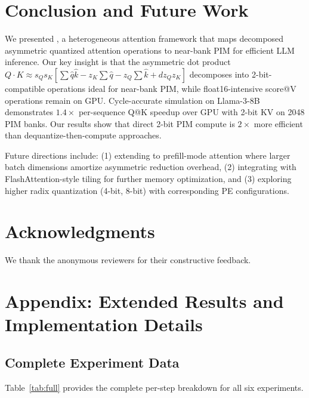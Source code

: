 \section{Conclusion and Future Work}
\label{sec:conclusion}

We presented \pimattn{}, a heterogeneous attention framework that maps decomposed asymmetric quantized attention operations to near-bank PIM for efficient LLM inference.
Our key insight is that the asymmetric dot product $Q\cdot K \approx s_Q s_K[\sum \hat{q}\hat{k} - z_K\sum\hat{q} - z_Q\sum\hat{k} + d z_Q z_K]$ decomposes into 2-bit-compatible operations ideal for near-bank PIM, while float16-intensive score@V operations remain on GPU.
Cycle-accurate simulation on Llama-3-8B demonstrates $1.4\times$ per-sequence Q@K speedup over GPU with 2-bit KV on 2048 PIM banks.
Our results show that direct 2-bit PIM compute is $2\times$ more efficient than dequantize-then-compute approaches.

Future directions include: (1) extending to prefill-mode attention where larger batch dimensions amortize asymmetric reduction overhead, (2) integrating with FlashAttention-style tiling for further memory optimization, and (3) exploring higher radix quantization (4-bit, 8-bit) with corresponding PE configurations.

\section*{Acknowledgments}
We thank the anonymous reviewers for their constructive feedback.

\newpage
\section{Appendix: Extended Results and Implementation Details}

\subsection{Complete Experiment Data}

Table~\ref{tab:full} provides the complete per-step breakdown for all six experiments.

